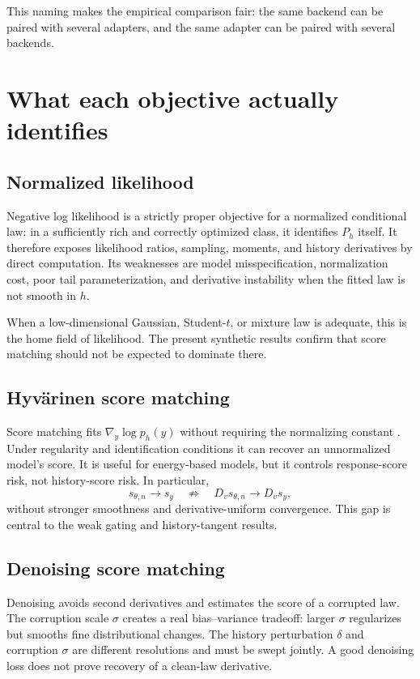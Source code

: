 \documentclass[10pt]{article}
\begin{document}
This naming makes the empirical comparison fair: the same backend can be paired with several adapters, and the same adapter can be paired with several backends.

\section{What each objective actually identifies}

\subsection{Normalized likelihood}

Negative log likelihood is a strictly proper objective for a normalized conditional law: in a sufficiently rich and correctly optimized class, it identifies \(P_h\) itself. It therefore exposes likelihood ratios, sampling, moments, and history derivatives by direct computation. Its weaknesses are model misspecification, normalization cost, poor tail parameterization, and derivative instability when the fitted law is not smooth in \(h\).

When a low-dimensional Gaussian, Student-\(t\), or mixture law is adequate, this is the home field of likelihood. The present synthetic results confirm that score matching should not be expected to dominate there.

\subsection{Hyv\"arinen score matching}

Score matching fits \(\nabla_y\log p_h(y)\) without requiring the normalizing constant \cite{hyvarinen2005}. Under regularity and identification conditions it can recover an unnormalized model's score. It is useful for energy-based models, but it controls response-score risk, not history-score risk. In particular,
\[
  s_{\theta,n}\to s_y
  \quad\not\Rightarrow\quad
  D_v s_{\theta,n}\to D_v s_y,
\]
without stronger smoothness and derivative-uniform convergence. This gap is central to the weak gating and history-tangent results.

\subsection{Denoising score matching}

Denoising avoids second derivatives and estimates the score of a corrupted law. The corruption scale \(\sigma\) creates a real bias--variance tradeoff: larger \(\sigma\) regularizes but smooths fine distributional changes. The history perturbation \(\delta\) and corruption \(\sigma\) are different resolutions and must be swept jointly. A good denoising loss does not prove recovery of a clean-law derivative.
\end{document}
